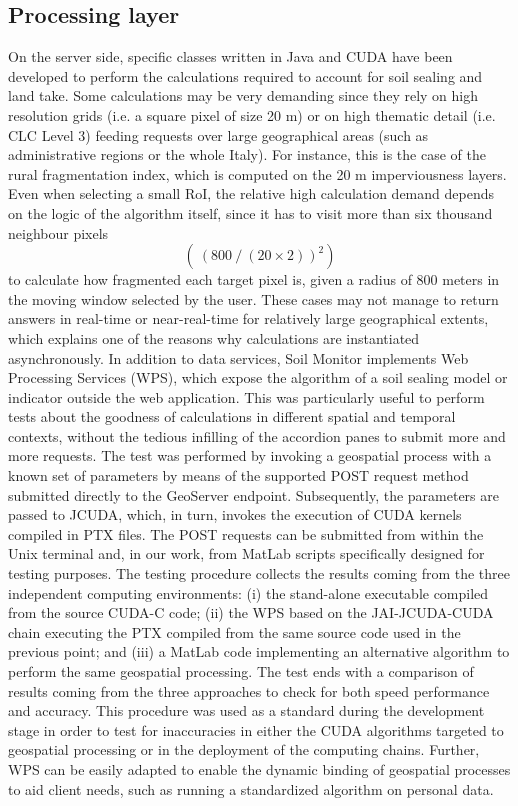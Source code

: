 \documentclass[APA,LATO1COL,doublespace]{WileyNJD-v2}
\begin{document}
\subsection{Processing layer}
On the server side, specific classes written in Java and CUDA have been developed to perform the calculations required to account for soil sealing and land take. Some calculations may be very demanding since they rely on high resolution grids (i.e. a square pixel of size 20 m) or on high thematic detail (i.e. CLC Level 3) feeding requests over large geographical areas (such as administrative regions or the whole Italy). For instance, this is the case of the rural fragmentation index, which is computed on the 20 m imperviousness layers. Even when selecting a small RoI, the relative high calculation demand depends on the logic of the algorithm itself, since it has to visit more than six thousand neighbour pixels $$(~(800⁄(20×2))^2 )$$ to calculate how fragmented each target pixel is, given a radius of 800 meters in the moving window selected by the user. These cases may not manage to return answers in real-time or near-real-time for relatively large geographical extents, which explains one of the reasons why calculations are instantiated asynchronously.
In addition to data services, Soil Monitor implements Web Processing Services (WPS), which expose the algorithm of a soil sealing model or indicator outside the web application. This was particularly useful to perform tests about the goodness of calculations in different spatial and temporal contexts, without the tedious infilling of the accordion panes to submit more and more requests. The test was performed by invoking a geospatial process with a known set of parameters by means of the supported POST request method submitted directly to the GeoServer endpoint. Subsequently, the parameters are passed to JCUDA, which, in turn, invokes the execution of CUDA kernels compiled in PTX files. The POST requests can be submitted from within the Unix terminal and, in our work, from MatLab scripts specifically designed for testing purposes. The testing procedure collects the results coming from the three independent computing environments: (i) the stand-alone executable compiled from the source CUDA-C code; (ii) the WPS based on the JAI-JCUDA-CUDA chain executing the PTX compiled from the same source code used in the previous point; and (iii) a MatLab code implementing an alternative algorithm to perform the same geospatial processing. The test ends with a comparison of results coming from the three approaches to check for both speed performance and accuracy. This procedure was used as a standard during the development stage in order to test for inaccuracies in either the CUDA algorithms targeted to geospatial processing or in the deployment of the computing chains. Further, WPS can be easily adapted to enable the dynamic binding of geospatial processes to aid client needs, such as running a standardized algorithm on personal data.
\end{document}

